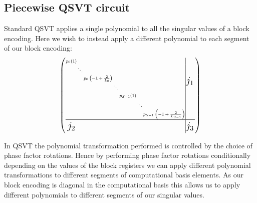 \documentclass[a4paper,twocolumn,,accepted=2025-05-27]{quantumarticle}
\theoremstyle{empty}
\begin{document}
\subsection{Piecewise QSVT circuit}
\label{section:circuit}
Standard QSVT applies a single polynomial to all the singular values of a block encoding. Here we wish to instead apply a different polynomial to each segment of our block encoding:
\begin{equation}
\footnotesize
\setlength{\arraycolsep}{0.5pt}
\renewcommand{\arraystretch}{1}
\left(
\begin{array}{ccccccc|cc}
\scalebox{0.8}{$p_0(1)$} &       &       &       &       &       &       & \multirow{7}{*}{\Large $j_1$} & \\
       & \scalebox{0.8}{$\ddots$} &       &       &       &       &       & & \\
       &       & \scalebox{0.8}{$p_0\left(-1 + \frac{2}{L_0}\right)$} & & & & & & \\
       &       &       & \scalebox{0.8}{$\ddots$} & & & & & \\
       &       &       &       & \scalebox{0.8}{$p_{S-1}(1)$} & & & & \\
       &       &       &       &       & \scalebox{0.8}{$\ddots$} & & & \\
       &       &       &       &       &       & \scalebox{0.8}{$p_{S-1}\left(-1 + \frac{2}{L_{S-1}}\right)$} & & \\
\hline
\multirow{2}{*}{\Large $j_2$} &       &       &       &       &       &       & \multirow{2}{*}{\Large $j_3$} & \\
                              &       &       &       &       &       &       & & \\
\end{array}
\right)
\normalsize
\label{eq:qsvt_blockencoding}
\end{equation}


In QSVT the polynomial transformation performed is controlled by the choice of phase factor rotations. Hence by performing phase factor rotations conditionally depending on the values of the block registers we can apply different polynomial transformations to different segments of computational basis elements. As our block encoding is diagonal in the computational basis this allows us to apply different polynomials to different segments of our singular values. 
\end{document}
